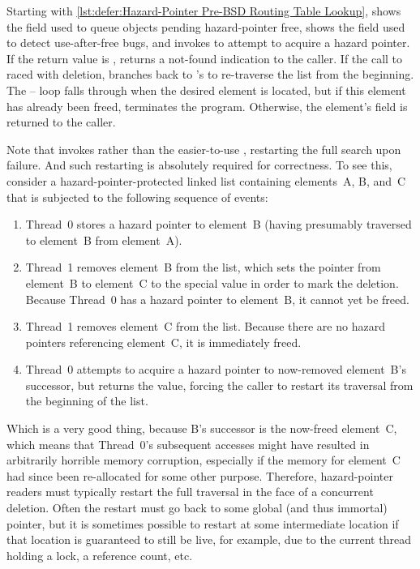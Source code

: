 \begin{fcvref}
Starting with
\cref{lst:defer:Hazard-Pointer Pre-BSD Routing Table Lookup},
 shows the  field used to queue objects pending
hazard-pointer free,
 shows the  field used to detect
use-after-free bugs, and  invokes
 to attempt to acquire a hazard pointer.
If the return value is ,  returns a not-found
indication to the caller.
If the call to  raced with deletion, 
branches back to 's  to re-traverse the list
from the beginning.
The -- loop falls through when the desired element is
located, but if this element has already been freed, 
terminates the program.
Otherwise, the element's  field is returned to the caller.

Note that  invokes  rather
than the easier-to-use , restarting the full search
upon  failure.
And such restarting is absolutely required for correctness.
To see this, consider a hazard-pointer-protected linked list
containing elements~A, B, and~C that is subjected to the following
sequence of events:
\end{fcvref}

\begin{enumerate}
\item	Thread~0 stores a hazard pointer to element~B
	(having presumably traversed to element~B from element~A).
\item	Thread~1 removes element~B from the list, which sets
	the pointer from element~B to element~C to the special
	 value in order to mark the deletion.
	Because Thread~0 has a hazard pointer to element~B,
	it cannot yet be freed.
\item	Thread~1 removes element~C from the list.
	Because there are no hazard pointers referencing element~C,
	it is immediately freed.
\item	Thread~0 attempts to acquire a hazard pointer to now-removed
	element~B's successor, but  returns the
	 value, forcing the caller to restart its
	traversal from the beginning of the list.
\end{enumerate}

Which is a very good thing, because B's successor is the now-freed
element~C, which means that Thread~0's subsequent accesses might have
resulted in arbitrarily horrible memory corruption, especially if the
memory for element~C had since been re-allocated for some other purpose.
Therefore, hazard-pointer readers must typically restart the full
traversal in the face of a concurrent deletion.
Often the restart must go back to some global (and thus immortal) pointer,
but it is sometimes possible to restart at some intermediate location
if that location is guaranteed to still be live, for example, due to
the current thread holding a lock, a reference count, etc.

